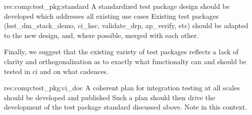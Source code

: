\begin{recommendation}
  {rec:comp:test_pkg:standard}
  {A standardized test package design should be developed which addresses all existing use cases}
Existing test packages (lsst\_dm\_stack\_demo, ci\_hsc, validate\_drp, ap\_verify, etc) should be adapted to the new design, and, where possible, merged with each other.
\end{recommendation}

Finally, we suggest that the existing variety of test packages reflects a lack of clarity and orthogonalization as to exactly what functionalty can and should be tested in \gls{ci} and on what cadences.

\begin{recommendation}
  {rec:comp:test_pkg:ci_doc}
  {A coherent plan for integration testing at all scales should be developed and published}
Such a plan should then drive the development of the test package standard discussed above.
Note  in this context.
\end{recommendation}
